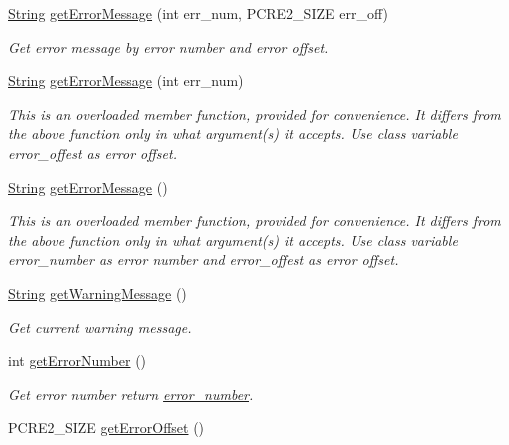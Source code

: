 \begin{DoxyCompactItemize}
\hyperlink{namespacejpcre2_a91f03070152fb228bc116c5a737f1d16}{String} \hyperlink{classjpcre2_1_1Regex_a92b75c438ccff871205b2175a6141fd5}{get\+Error\+Message} (int err\+\_\+num, P\+C\+R\+E2\+\_\+\+S\+I\+ZE err\+\_\+off)
\begin{DoxyCompactList}\small\item\em Get error message by error number and error offset. \end{DoxyCompactList}\item 
\hyperlink{namespacejpcre2_a91f03070152fb228bc116c5a737f1d16}{String} \hyperlink{classjpcre2_1_1Regex_a76fddd42bf11dd66c25905fb92437d6b}{get\+Error\+Message} (int err\+\_\+num)
\begin{DoxyCompactList}\small\item\em This is an overloaded member function, provided for convenience. It differs from the above function only in what argument(s) it accepts. Use class variable error\+\_\+offest as error offset. \end{DoxyCompactList}\item 
\hyperlink{namespacejpcre2_a91f03070152fb228bc116c5a737f1d16}{String} \hyperlink{classjpcre2_1_1Regex_a8606fff8b192c94f58ca9e82aa048c61}{get\+Error\+Message} ()
\begin{DoxyCompactList}\small\item\em This is an overloaded member function, provided for convenience. It differs from the above function only in what argument(s) it accepts. Use class variable error\+\_\+number as error number and error\+\_\+offest as error offset. \end{DoxyCompactList}\item 
\hyperlink{namespacejpcre2_a91f03070152fb228bc116c5a737f1d16}{String} \hyperlink{classjpcre2_1_1Regex_a1a639ae4090b88609c03e9268faf02d8}{get\+Warning\+Message} ()
\begin{DoxyCompactList}\small\item\em Get current warning message. \end{DoxyCompactList}\item 
int \hyperlink{classjpcre2_1_1Regex_a7294273e7d11907a749f2db40da9ed15}{get\+Error\+Number} ()\hypertarget{classjpcre2_1_1Regex_a7294273e7d11907a749f2db40da9ed15}{}\label{classjpcre2_1_1Regex_a7294273e7d11907a749f2db40da9ed15}

\begin{DoxyCompactList}\small\item\em Get error number return \hyperlink{classjpcre2_1_1Regex_a91b7b795c9efe76ef4e015325ff33f1c}{error\+\_\+number}. \end{DoxyCompactList}\item 
P\+C\+R\+E2\+\_\+\+S\+I\+ZE \hyperlink{classjpcre2_1_1Regex_a1c7822056cd7ac9a6be5e18513bd8093}{get\+Error\+Offset} ()\hypertarget{classjpcre2_1_1Regex_a1c7822056cd7ac9a6be5e18513bd8093}{}\label{classjpcre2_1_1Regex_a1c7822056cd7ac9a6be5e18513bd8093}


\end{DoxyCompactItemize}
